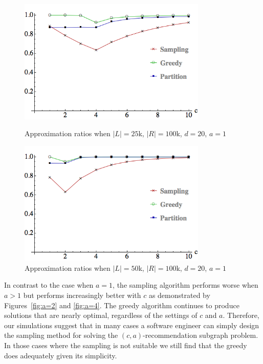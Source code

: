 \begin{figure}[t]
\centering
\begin{minipage}[h]{0.45\textwidth}
\centering
\includegraphics[width=0.8\textwidth]{images/l=25000,r=100000_Greedy_vs_Naive.png}
\caption{Approximation ratios when $|L|=25$k, $|R|=100$k, $d=20$, $a=1$}\label{fig:a=1:1}
\end{minipage}
\hspace{0.2cm}
\begin{minipage}[h]{0.45\textwidth}
\centering
\includegraphics[width=0.8\textwidth]{images/l=50000,r=100000_Greedy_vs_Naive.png}
\caption{Approximation ratios when $|L|=50$k, $|R|=100$k, $d=20$, $a=1$}\label{fig:a=1:2}
\end{minipage}
\end{figure}



In contrast to the case when $a=1$, the sampling algorithm performs
worse when $a>1$ but performs increasingly better with $c$ as
demonstrated by Figures~\ref{fig:a=2} and \ref{fig:a=4}. The greedy
algorithm continues to produce solutions that are nearly optimal,
regardless of the settings of $c$ and $a$. Therefore, our simulations
suggest that in many cases a software engineer can simply design the
sampling method for solving the $(c, a)$-recommendation subgraph
problem. In those cases where the sampling is not suitable we still
find that the greedy does adequately given its simplicity.

